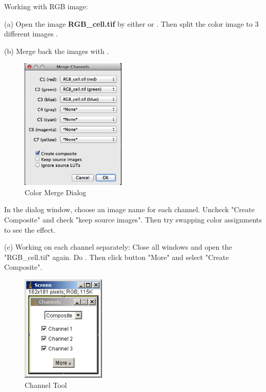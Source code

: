 \begin{indentexercise}{1}
Working with RGB image:
 
\item (a) Open the image \textbf{RGB\_cell.tif} by either  or . Then split the color image to 3 different images . 

\item (b) Merge back the images with . 

\begin{figure}[H]
\begin{center}
\includegraphics[width=5cm]{fig/dialog_colormerge.png}
\caption{ Color Merge Dialog}
\label{fig:img14}
\end{center}
\end{figure}

In the dialog window, choose an image name for each channel. Uncheck
"Create Composite" and check
"keep source images". Then try
swapping color assignments to see the effect. 

\item (c) Working on each channel separately: Close all windows and
open the "RGB\_cell.tif" again. Do
. Then click button "More" and select "Create Composite".
\begin{figure}[H]
\begin{center}
\includegraphics[width=4cm]{fig/CMCIBasicCourse201102-img15.png}
\caption{ Channel Tool}
\label{fig:img15}
\end{center}
\end{figure}


\end{indentexercise}
